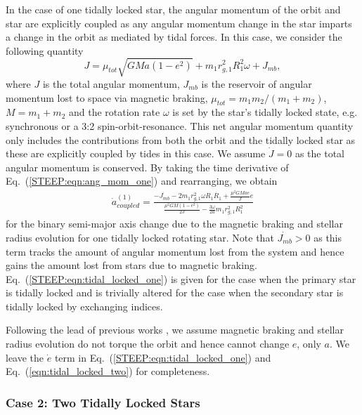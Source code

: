 In the case of one tidally locked star, the angular momentum of the orbit and star are explicitly coupled as any angular momentum change in the star imparts a change in the orbit as mediated by tidal forces.  In this case, we consider the following quantity
\begin{equation} \label{STEEP:eqn:ang_mom_one}
J = \mu_{tot} \sqrt{GMa(1-e^2)} + m_1 r_{g,1}^2 R_1^2 \omega + J_{mb},
\end{equation}
where $J$ is the total angular momentum, $J_{mb}$ is the reservoir of angular momentum lost to space via magnetic braking, $\mu_{tot} = m_1 m_2 / (m_1 + m_2)$, $M = m_1 + m_2$ and the rotation rate $\omega$ is set by the star's tidally locked state, e.g. synchronous or a 3:2 spin-orbit-resonance.  This net angular momentum quantity only includes the contributions from both the orbit and the tidally locked star as these are explicitly coupled by tides in this case.  We assume $\dot{J} = 0$ as the total angular momentum is conserved.  By taking the time derivative of Eq.~(\ref{STEEP:eqn:ang_mom_one}) and rearranging, we obtain
\begin{equation} \label{STEEP:eqn:tidal_locked_one}
\begin{split}
\dot{a}_{coupled}^{(1)} = \frac{-\dot{J_{mb}} - 2 m_1 r_{g,1}^2 \omega R_1 \dot{R_1} + \frac{\mu^2 G M a e }{J} \dot{e}}
{\frac{\mu^2 G M (1-e^2)}{2J} - \frac{3 \omega}{2a} m_1 r_{g,1}^2 R_1^2}
\end{split}
\end{equation}
for the binary semi-major axis change due to the magnetic braking and stellar radius evolution for one tidally locked rotating star.  Note that $\dot{J_{mb}} > 0$ as this term tracks the amount of angular momentum lost from the system and hence gains the amount lost from stars due to magnetic braking.  Eq.~(\ref{STEEP:eqn:tidal_locked_one}) is given for the case when the primary star is tidally locked and is trivially altered for the case when the secondary star is tidally locked by exchanging indices. 

Following the lead of previous works \citep[e.g.][]{Verbunt1981,Repetto2014}, we assume magnetic braking and stellar radius evolution do not torque the orbit and hence cannot change $e$, only $a$.  We leave the $\dot{e}$ term in Eq.~(\ref{STEEP:eqn:tidal_locked_one}) and Eq.~(\ref{eqn:tidal_locked_two}) for completeness.

\subsubsection{Case 2: Two Tidally Locked Stars}

